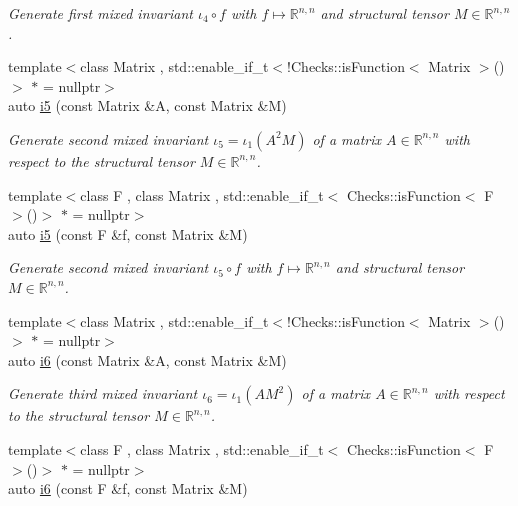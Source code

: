 \begin{DoxyCompactItemize}
\begin{DoxyCompactList}\small\item\em Generate first mixed invariant $ \iota_4\circ f $ with $f\mapsto\mathbb{R}^{n,n}$ and structural tensor $M\in\mathbb{R}^{n,n}$. \end{DoxyCompactList}\item 
{\footnotesize template$<$class Matrix , std\-::enable\-\_\-if\-\_\-t$<$!\-Checks\-::is\-Function$<$ Matrix $>$()$>$ $\ast$  = nullptr$>$ }\\auto \hyperlink{group__InvariantGroup_gabedc42182203d883278e29fd16b355a0}{i5} (const Matrix \&A, const Matrix \&M)
\begin{DoxyCompactList}\small\item\em Generate second mixed invariant $ \iota_5=\iota_1(A^2M) $ of a matrix $A\in\mathbb{R}^{n,n}$ with respect to the structural tensor $M\in\mathbb{R}^{n,n}$. \end{DoxyCompactList}\item 
{\footnotesize template$<$class F , class Matrix , std\-::enable\-\_\-if\-\_\-t$<$ Checks\-::is\-Function$<$ F $>$()$>$ $\ast$  = nullptr$>$ }\\auto \hyperlink{group__InvariantGroup_gaed7e47c39d89f2b01e25c992da78b44d}{i5} (const F \&f, const Matrix \&M)
\begin{DoxyCompactList}\small\item\em Generate second mixed invariant $ \iota_5\circ f $ with $f\mapsto\mathbb{R}^{n,n}$ and structural tensor $M\in\mathbb{R}^{n,n}$. \end{DoxyCompactList}\item 
{\footnotesize template$<$class Matrix , std\-::enable\-\_\-if\-\_\-t$<$!\-Checks\-::is\-Function$<$ Matrix $>$()$>$ $\ast$  = nullptr$>$ }\\auto \hyperlink{group__InvariantGroup_gad9f0627946667bb052212f65ecdd002b}{i6} (const Matrix \&A, const Matrix \&M)
\begin{DoxyCompactList}\small\item\em Generate third mixed invariant $ \iota_6=\iota_1(AM^2) $ of a matrix $A\in\mathbb{R}^{n,n}$ with respect to the structural tensor $M\in\mathbb{R}^{n,n}$. \end{DoxyCompactList}\item 
{\footnotesize template$<$class F , class Matrix , std\-::enable\-\_\-if\-\_\-t$<$ Checks\-::is\-Function$<$ F $>$()$>$ $\ast$  = nullptr$>$ }\\auto \hyperlink{group__InvariantGroup_ga2536c80df733bb3e089487202c3688c1}{i6} (const F \&f, const Matrix \&M)

\end{DoxyCompactItemize}
